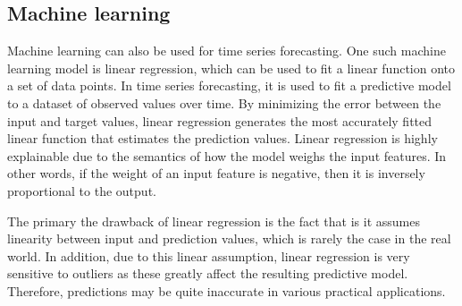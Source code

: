 \subsection{Machine learning}
Machine learning can also be used for time series forecasting. 
One such machine learning model is linear regression, which can be used to fit a linear function onto a set of data points.
In time series forecasting, it is used to fit a predictive model to a dataset of observed values over time.
By minimizing the error between the input and target values, linear regression generates the most accurately fitted linear function that estimates the prediction values.
Linear regression is highly explainable due to the semantics of how the model weighs the input features. 
In other words, if the weight of an input feature is negative, then it is inversely proportional to the output. \cite{pooleArtificialIntelligenceFoundations2017}

The primary the drawback of linear regression is the fact that is it assumes linearity between input and prediction values, which is rarely the case in the real world.
In addition, due to this linear assumption, linear regression is very sensitive to outliers as these greatly affect the resulting predictive model.
Therefore, predictions may be quite inaccurate in various practical applications. \cite{kumarProfessionalsPointAdvantages2019}
